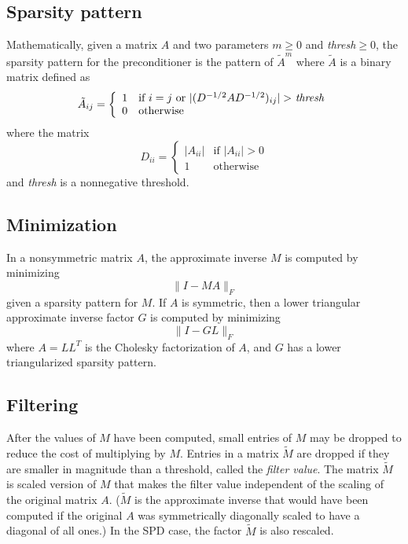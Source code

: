 \subsection{Sparsity pattern}
\label{sparsity}
Mathematically, given a matrix $A$ and two parameters $m \ge 0$ and
{\em thresh}$\ge 0$,
the sparsity pattern for the preconditioner is the pattern of $\tilde{A}^m$
where $\tilde{A}$ is a binary matrix defined as
\[
\tilde{A}_{ij} = \left\{ \begin{array}{ll}
   1 & \mbox{if $i=j$ or $|(D^{-1/2} A D^{-1/2})_{ij}| >$ {\em thresh}} \\
   0 & \mbox{otherwise}
                 \end{array} \right.
\]
where the matrix
\[
D_{ii} = \left\{ \begin{array}{ll}
    |A_{ii}| & \mbox{if $|A_{ii}| > 0$} \\
    1 & \mbox{otherwise}
    \end{array} \right.
\]
and {\em thresh} is a nonnegative threshold.

\subsection{Minimization}
In a nonsymmetric matrix $A$, the approximate inverse $M$ is computed by
minimizing
\begin{equation}
\| I - M A \|_F
\label{eq:1}
\end{equation}
given a sparsity pattern for $M$.  If $A$ is symmetric, then a lower
triangular approximate inverse factor $G$ is computed by minimizing
\[
\| I - G L \|_F
\]
where $A=LL^T$ is the Cholesky factorization of $A$, and $G$ has
a lower triangularized sparsity pattern.

\subsection{Filtering}
After the values of $M$ have
been computed, small entries of $M$
may be dropped to reduce the cost of multiplying by $M$.
Entries in a matrix $\tilde{M}$ are dropped if they are smaller in
magnitude than a threshold, called the {\em filter value}.
The matrix $\tilde{M}$ is
scaled version of $M$ that makes the filter value independent of
the scaling of the original matrix $A$.  ($\tilde{M}$
is the approximate inverse that would have been computed if
the original $A$ was symmetrically diagonally scaled to have
a diagonal of all ones.)
In the SPD case, the factor $\tilde{M}$ is also rescaled.

